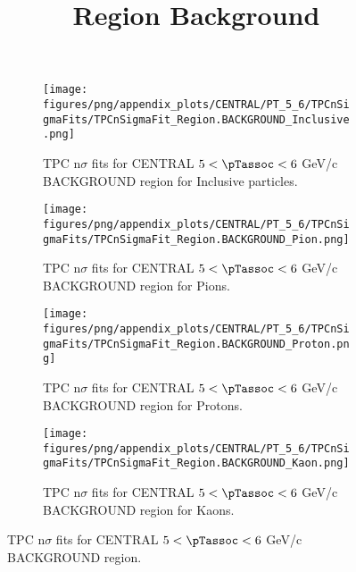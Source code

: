             \begin{figure}[H]
                \title{Region Background}
                \begin{subfigure}[b]{0.5\textwidth}
                    \centering
                    \texttt{[image: figures/png/appendix\_plots/CENTRAL/PT\_5\_6/TPCnSigmaFits/TPCnSigmaFit\_Region.BACKGROUND\_Inclusive.png]}
                    \caption{TPC n$\sigma$ fits for CENTRAL $5 < \pTassoc < 6$ GeV/c BACKGROUND region for Inclusive particles.}
                    \label{fig:appendix_CENTRAL_$5 < \pTassoc < 6$ GeV/c_BACKGROUND_Inclusive}
                \end{subfigure}
                \begin{subfigure}[b]{0.5\textwidth}
                    \centering
                    \texttt{[image: figures/png/appendix\_plots/CENTRAL/PT\_5\_6/TPCnSigmaFits/TPCnSigmaFit\_Region.BACKGROUND\_Pion.png]}
                    \caption{TPC n$\sigma$ fits for CENTRAL $5 < \pTassoc < 6$ GeV/c BACKGROUND region for Pions.}
                    \label{fig:appendix_CENTRAL_$5 < \pTassoc < 6$ GeV/c_BACKGROUND_Pion}
                \end{subfigure}
                \begin{subfigure}[b]{0.5\textwidth}
                    \centering
                    \texttt{[image: figures/png/appendix\_plots/CENTRAL/PT\_5\_6/TPCnSigmaFits/TPCnSigmaFit\_Region.BACKGROUND\_Proton.png]}
                    \caption{TPC n$\sigma$ fits for CENTRAL $5 < \pTassoc < 6$ GeV/c BACKGROUND region for Protons.}
                    \label{fig:appendix_CENTRAL_$5 < \pTassoc < 6$ GeV/c_BACKGROUND_Proton}
                \end{subfigure}
                \begin{subfigure}[b]{0.5\textwidth}
                    \centering
                    \texttt{[image: figures/png/appendix\_plots/CENTRAL/PT\_5\_6/TPCnSigmaFits/TPCnSigmaFit\_Region.BACKGROUND\_Kaon.png]}
                    \caption{TPC n$\sigma$ fits for CENTRAL $5 < \pTassoc < 6$ GeV/c BACKGROUND region for Kaons.}
                    \label{fig:appendix_CENTRAL_$5 < \pTassoc < 6$ GeV/c_BACKGROUND_Kaon}
                \end{subfigure}
                \caption{TPC n$\sigma$ fits for CENTRAL $5 < \pTassoc < 6$ GeV/c BACKGROUND region.}
                \label{fig:appendix_CENTRAL_$5 < \pTassoc < 6$ GeV/c_BACKGROUND}
            \end{figure}
            \clearpage
            
